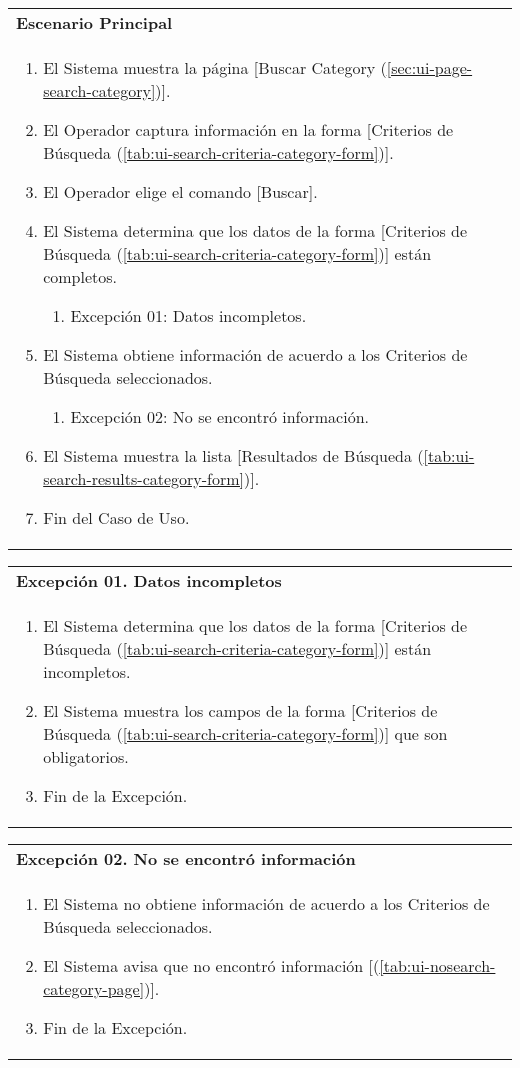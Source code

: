 	\begin{tabular}{ p{15.5cm} }
		\textbf{Escenario Principal} \\
		\begin{enumerate}
			\item El Sistema muestra la p\'agina [Buscar Category (\ref{sec:ui-page-search-category})].
			\item El Operador captura informaci\'on en la forma [Criterios de B\'usqueda (\ref{tab:ui-search-criteria-category-form})].
			\item El Operador elige el comando [Buscar].
			\item El Sistema determina que los datos de la forma [Criterios de B\'usqueda (\ref{tab:ui-search-criteria-category-form})] est\'an completos.
				\begin{enumerate}
					\item Excepci\'on 01: Datos incompletos.
				\end{enumerate}
			\item El Sistema obtiene informaci\'on de acuerdo a los Criterios de B\'usqueda seleccionados.
				\begin{enumerate}
					\item Excepci\'on 02: No se encontr\'o informaci\'on.
				\end{enumerate}
			\item El Sistema muestra la lista [Resultados de B\'usqueda (\ref{tab:ui-search-results-category-form})].
			\item Fin del Caso de Uso.
		\end{enumerate}
	\end{tabular}
	
	\begin{tabular}{ p{15.5cm} }
		\textbf{Excepci\'on 01. Datos incompletos} \\
		\begin{enumerate}
			\item El Sistema determina que los datos de la forma [Criterios de B\'usqueda (\ref{tab:ui-search-criteria-category-form})] est\'an incompletos.
			\item El Sistema muestra los campos de la forma [Criterios de B\'usqueda (\ref{tab:ui-search-criteria-category-form})] que son obligatorios.
			\item Fin de la Excepci\'on.
		\end{enumerate}
	\end{tabular}
	
	\begin{tabular}{ p{15.5cm} }
		\textbf{Excepci\'on 02. No se encontr\'o informaci\'on} \\
		\begin{enumerate}
			\item El Sistema no obtiene informaci\'on de acuerdo a los Criterios de B\'usqueda seleccionados.
			\item El Sistema avisa que no encontr\'o informaci\'on [(\ref{tab:ui-nosearch-category-page})].
			\item Fin de la Excepci\'on.
		\end{enumerate}
	\end{tabular}
	

